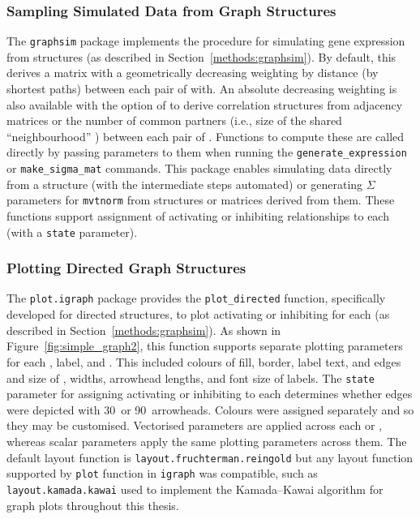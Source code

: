 \subsubsection{Sampling Simulated Data from Graph Structures}
The \texttt{graphsim} package implements the procedure for simulating \gls{gene expression} from  structures (as described in Section~\ref{methods:graphsim}). By default, this derives a matrix with a geometrically decreasing weighting by distance (by \glspl{shortest path}) between each pair of  with. An absolute decreasing weighting is also available with the option of to derive correlation structures from adjacency matrices or the number of  common partners (i.e., size of the shared ``neighbourhood'' \citep{Hell1976}) between each pair of . Functions to compute these are called directly by passing parameters to them when running the \texttt{generate\_expression} or \texttt{make\_sigma\_mat} commands. This package enables simulating  data directly from a  structure (with the intermediate steps automated) or generating $\Sigma$ parameters for \texttt{mvtnorm} from  structures or matrices derived from them. These functions support assignment of activating or inhibiting relationships to each  (with a \texttt{state} parameter).

\subsubsection{Plotting Directed Graph Structures}
The \texttt{plot.igraph} package provides the \texttt{plot\_directed} function, specifically developed for directed  structures, to plot activating or inhibiting for each  (as described in Section~\ref{methods:graphsim}). As shown in Figure~\ref{fig:simple_graph2}, this function supports separate plotting parameters for each ,  label, and . This included colours of  fill, border, label text, and \glspl{edge} and size of ,  widths, arrowhead lengths, and font size of labels. The  \texttt{state} parameter for assigning activating or inhibiting to each  determines whether \glspl{edge} were depicted with 30\textdegree\ or 90\textdegree\ arrowheads. Colours were assigned separately and so they may be customised. Vectorised parameters are applied across each  or , whereas scalar parameters apply the same plotting parameters across them. The default layout function is \texttt{layout.fruchterman.reingold} but any layout function supported by \texttt{plot} function in \texttt{igraph} \citep{igraph} was compatible, such as \texttt{layout.kamada.kawai} used to implement the Kamada--Kawai algorithm \citep{Kamada1989} for graph plots throughout this thesis.
 

